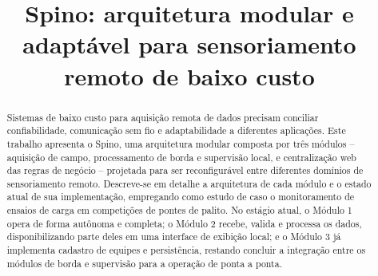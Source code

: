 \documentclass[conference]{IEEEtran}
\begin{document}
\title{Spino: arquitetura modular e adaptável para sensoriamento remoto de baixo custo}

\author{
\and
{}
\and
{}
\and
{}
}

\maketitle

\begin{abstract}
Sistemas de baixo custo para aquisição remota de dados precisam conciliar confiabilidade, comunicação sem fio e adaptabilidade a diferentes aplicações. Este trabalho apresenta o Spino, uma arquitetura modular composta por três módulos -- aquisição de campo, processamento de borda e supervisão local, e centralização web das regras de negócio -- projetada para ser reconfigurável entre diferentes domínios de sensoriamento remoto. Descreve-se em detalhe a arquitetura de cada módulo e o estado atual de sua implementação, empregando como estudo de caso o monitoramento de ensaios de carga em competições de pontes de palito. No estágio atual, o Módulo 1 opera de forma autônoma e completa; o Módulo 2 recebe, valida e processa os dados, disponibilizando parte deles em uma interface de exibição local; e o Módulo 3 já implementa cadastro de equipes e persistência, restando concluir a integração entre os módulos de borda e supervisão para a operação de ponta a ponta.
\end{abstract}
\end{document}
